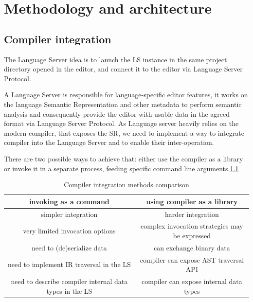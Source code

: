 \chapter{Methodology and architecture}
\label{chap:met}

\section{Compiler integration}
\label{sec:met:ls_compiler_interop}
The Language Server idea is to launch the LS instance in the same project directory
opened in the editor, and connect it to the editor via Language Server Protocol.

A Language Server is responsible for language-specific editor features,
it works on the language Semantic Representation and other metadata
to perform semantic analysis and consequently provide the editor with usable data in the agreed format via Language Server Protocol.
As Language server heavily relies on the modern compiler, that exposes the SR,
we need to implement a way to integrate compiler into the Language Server and to enable their inter-operation.

There are two possible ways to achieve that: either use the compiler as a library or invoke it in a separate process,
feeding specific command line arguments.\ref{table:met:compiler_integration}
\begin{table}[H]
    \centering
    \begin{tabular}{|c|c|}
        \hline
        \textbf{invoking as a command} & \textbf{using compiler as a library} \\
        \hline
        simpler integration & harder integration \\
        \hline
        very limited invocation options & complex invocation strategies may be expressed \\
        \hline
        need to (de)serialize data & can exchange binary data \\
        \hline
        need to implement IR traversal in the LS & compiler can expose AST traversal API \\
        \hline
        need to describe compiler internal data types in the LS & compiler can expose internal data types \\
        \hline
    \end{tabular}
    \caption{Compiler integration methods comparison}
    \label{table:met:compiler_integration}
\end{table}

